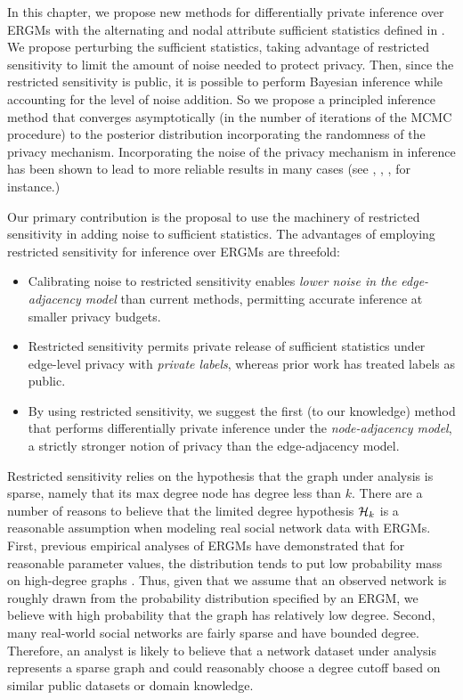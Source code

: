 In this chapter, we propose new methods for differentially private inference over ERGMs with the alternating and nodal attribute sufficient statistics defined in . We propose perturbing the sufficient statistics, taking advantage of restricted sensitivity to limit the amount of noise needed to protect privacy. Then, since the restricted sensitivity is public, it is possible to perform Bayesian inference while accounting for the level of noise addition. So we propose a principled inference method that converges asymptotically (in the number of iterations of the MCMC procedure) to the posterior distribution incorporating the randomness of the privacy mechanism. Incorporating the noise of the privacy mechanism in inference has been shown to lead to more reliable results in many cases (see \cite{FGWC16}, \cite{KS16}, \cite{KKS17}, \cite{LM14} for instance.) 

Our primary contribution is the proposal to use the machinery of restricted sensitivity in adding noise to sufficient statistics. The advantages of employing restricted sensitivity for inference over ERGMs are threefold:

\begin{itemize}
	\item Calibrating noise to restricted sensitivity enables \emph{lower noise in the edge-adjacency model} than current methods, permitting accurate inference at smaller privacy budgets.
	\item Restricted sensitivity permits private release of sufficient statistics under edge-level privacy with \emph{private labels}, whereas prior work has treated labels as public.
	\item By using restricted sensitivity, we suggest the first (to our knowledge) method that performs differentially private inference under the \emph{node-adjacency model}, a strictly stronger notion of privacy than the edge-adjacency model.
\end{itemize} 

Restricted sensitivity relies on the hypothesis that the graph under analysis is sparse, namely that its max degree node has degree less than $k$.  There are a number of reasons to believe that the limited degree hypothesis $\mathcal{H}_k$ is a reasonable assumption when modeling real social network data with ERGMs. First, previous empirical analyses of ERGMs have demonstrated that for reasonable parameter values, the distribution tends to put low probability mass on high-degree graphs \cite{Sni+06}. Thus, given that we assume that an observed network is roughly drawn from the probability distribution specified by an ERGM, we believe with high probability that the graph has relatively low degree. Second, many real-world social networks are fairly sparse and have bounded degree. Therefore, an analyst is likely to believe that a network dataset under analysis represents a sparse graph and could reasonably choose a degree cutoff based on similar public datasets or domain knowledge.

